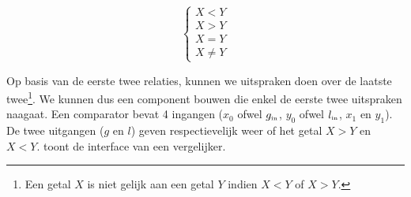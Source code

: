\begin{equation}
\left\{\begin{array}{c}
X<Y\\
X>Y\\
X=Y\\
X\neq Y
\end{array}\right.
\end{equation}

Op basis van de eerste twee relaties, kunnen we uitspraken doen over de laatste twee\footnote{Een getal $X$ is niet gelijk aan een getal $Y$ indien $X<Y$ of $X>Y$.}. We kunnen dus een component bouwen die enkel de eerste twee uitspraken naagaat. Een comparator bevat 4 ingangen ($x_0$ ofwel $g_{\mbox{\tiny{in}}}$, $y_0$ ofwel $l_{\mbox{\tiny{in}}}$, $x_1$ en $y_1$). De twee uitgangen ($g$ en $l$) geven respectievelijk weer of het getal $X>Y$ en $X<Y$.  toont de interface van een vergelijker.

